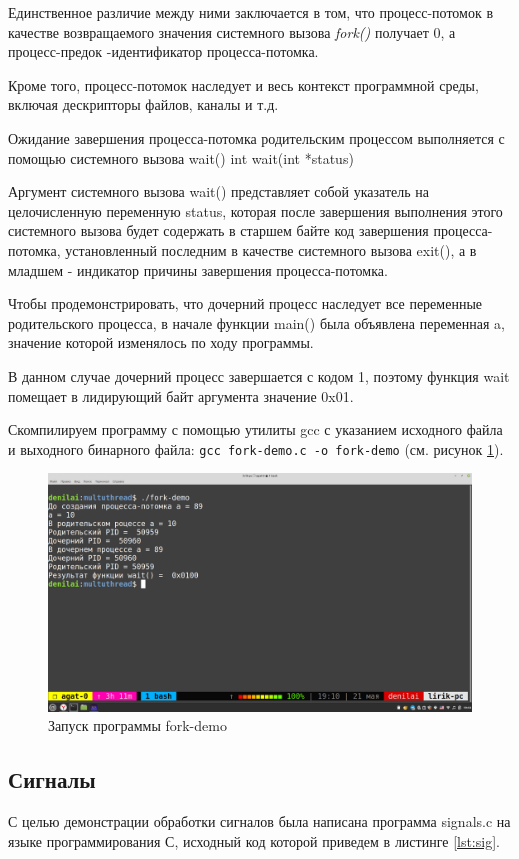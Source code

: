 \documentclass[a4paper,14pt]{extarticle}
\begin{document}
Единственное различие
между ними заключается в том, что процесс-потомок в качестве
возвращаемого значения системного вызова \textit{fork() }получает 0, а
процесс-предок -идентификатор процесса-потомка. 

Кроме того,
процесс-потомок наследует и весь контекст программной среды,
включая дескрипторы файлов, каналы и т.д.

Ожидание завершения процесса-потомка родительским
процессом выполняется с помощью системного вызова wait()
int wait(int *status)

Аргумент системного вызова wait() представляет собой
указатель на целочисленную переменную status, которая после
завершения выполнения этого системного вызова будет
содержать в старшем байте код завершения процесса-потомка,
установленный последним в качестве системного вызова exit(), а
в младшем - индикатор причины завершения процесса-потомка.

Чтобы продемонстрировать, что дочерний процесс наследует все переменные родительского процесса, в начале функции main() была объявлена переменная a, значение которой изменялось по ходу программы. 

В данном случае дочерний процесс завершается с кодом 1, поэтому функция wait помещает в лидирующий байт аргумента значение 0x01.

Скомпилируем программу с помощью утилиты gcc с указанием исходного файла и выходного бинарного файла:
\texttt{gcc fork-demo.c -o fork-demo} (см. рисунок \ref{fig:demo}).

\begin{figure}[h!]
	\centering
	\includegraphics[width=0.9\linewidth]{images/5/demo}
	\caption{Запуск программы fork-demo}
	\label{fig:demo}
\end{figure}

\subsection*{Сигналы}
С целью демонстрации обработки сигналов была написана программа signals.c на языке программирования С, исходный код которой приведем в листинге \ref{lst:sig}.
\end{document}
